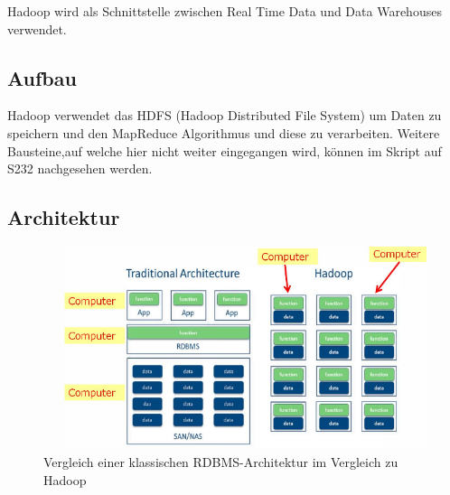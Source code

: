 \documentclass[a4paper, 11pt, nofootinbib]{article}
\begin{document}
\vspace{10px}

\noindent Hadoop wird als Schnittstelle zwischen Real Time Data und Data Warehouses verwendet.

\subsection{Aufbau}
Hadoop verwendet das HDFS (Hadoop Distributed File System) um Daten zu speichern und den MapReduce Algorithmus und diese zu verarbeiten. Weitere Bausteine,auf welche hier nicht weiter eingegangen wird, können im Skript auf S232 nachgesehen werden.

\subsection{Architektur}
\begin{figure}[htb]
	\centering
	\includegraphics[keepaspectratio=true,height=19\baselineskip]{hadoop_architektur.png}
	\caption{Vergleich einer klassischen RDBMS-Architektur im Vergleich zu Hadoop}
	\label{fig:hadoop_arch}
\end{figure}
\end{document}
